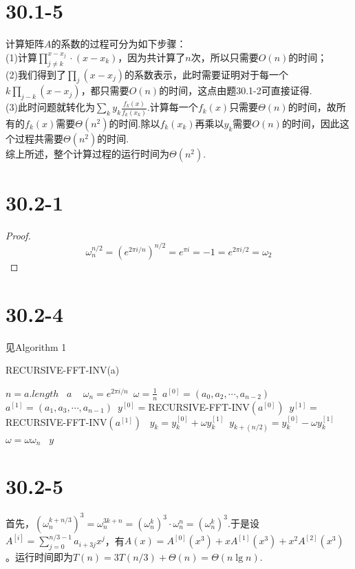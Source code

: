 \documentclass[twocolumn]{article}
\newenvironment{SChinese}{
	\CJKfamily{gbsn}
	\CJKtilde
	\CJKnospace}{}
\begin{document}
\begin{CJK}{UTF8}{}
\begin{SChinese}
			\section*{30.1-5}
				计算矩阵$A$的系数的过程可分为如下步骤：\\
				(1)计算$\prod_{j\neq k}^{x-x_j}\cdot(x-x_k)$，因为共计算了$n$次，所以只需要$O(n)$的时间；\\
				(2)我们得到了$\prod_{j}^{}(x-x_j)$的系数表示，此时需要证明对于每一个$k\prod_ {j-k}^{}(x-x_j)$，都只需要$O(n)$的时间，这点由题30.1-2可直接证得.\\
				(3)此时问题就转化为$\sum_{k}^{}y_k\frac{f_k(x)}{f_k(x_k)}$.计算每一个$f_k(x)$只需要$\Theta(n)$的时间，故所有的$f_k(x)$需要$\Theta(n^2)$的时间.除以$f_k(x_k)$再乘以$y_k$需要$O(n)$的时间，因此这个过程共需要$\Theta(n^2)$的时间.\\
				综上所述，整个计算过程的运行时间为$\Theta(n^2)$.
			\section*{30.2-1}
				\begin{proof}
					\begin{displaymath}
						\omega_n^{n/2}=(e^{2\pi i/n})^{n/2}=e^{\pi i}=-1=e^{2\pi i/2}=\omega_2
					\end{displaymath}
				\end{proof}
			\section*{30.2-4}
				见Algorithm 1\\
				\begin{algorithm}
					\caption{RECURSIVE-FFT-INV(a)}
					\begin{algorithmic}[1]
						\STATE $n = a.length$\
						\RETURN $a$ \
						\ENDIF	
						\STATE $\omega_n=e^{2\pi i/n}$\
						\STATE $\omega=\frac{1}{n}$\
						\STATE $a^{[0]}=(a_0,a_2,\cdots,a_{n-2})$\
						\STATE $a^{[1]}=(a_1,a_3,\cdots,a_{n-1})$\
						\STATE $y^{[0]}=$RECURSIVE-FFT-INV$(a^{[0]})$\
						\STATE $y^{[1]}=$RECURSIVE-FFT-INV$(a^{[1]})$\
						\STATE $y_k=y_k^{[0]}+\omega y_k^{[1]}$\
						\STATE $y_{k+(n/2)}=y_k^{[0]}-\omega y_k^{[1]}$\
						\STATE $\omega=\omega\omega_n$\
						\ENDFOR
						\RETURN $y$\	
					\end{algorithmic}
				\end{algorithm}
			
			\section*{30.2-5}
				首先，$(\omega_n^{k+n/3})^3=\omega_n^{3k+n}=(\omega_n^{k})^3\cdot\omega_n^n=(\omega_n^k)^3$.于是设$A^{[i]}=\sum_{j=0}^{n/3-1}a_{i+3j}x^j$，有$A(x)=A^{[0]}(x^3)+xA^{[1]}(x^3)+x^2A^{[2]}(x^3)$。运行时间即为$T(n)=3T(n/3)+\Theta(n)=\Theta(n\lg n)$.

\end{SChinese}
\end{CJK}
\end{document}
